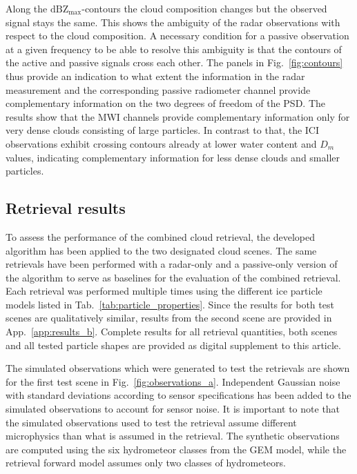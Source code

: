 \documentclass[journal abbreviation, manuscript]{copernicus}
\begin{document}
Along the $\text{dBZ}_\text{max}$-contours the cloud composition changes but the
observed signal stays the same. This shows the ambiguity of the radar
observations with respect to the cloud composition. A necessary condition for a
passive observation at a given frequency to be able to resolve this ambiguity is
that the contours of the active and passive signals cross each other. The panels
in Fig.~\ref{fig:contours} thus provide an indication to what extent the
information in the radar measurement and the corresponding passive radiometer
channel provide complementary information on the two degrees of freedom of the PSD. The
results show that the MWI channels provide complementary information only for
very dense clouds consisting of large particles. In contrast to that, the ICI
observations exhibit crossing contours already at lower water content and $D_m$
values, indicating complementary information for less dense clouds and
smaller particles.

\subsection{Retrieval results}

To assess the performance of the combined cloud retrieval, the developed
algorithm has been applied to the two designated cloud scenes. The same
retrievals have been performed with a radar-only and a passive-only version of
the algorithm to serve as baselines for the evaluation of the combined
retrieval. Each retrieval was performed multiple times using the different ice
particle models listed in Tab.~\ref{tab:particle_properties}. Since the results
for both test scenes are qualitatively similar, results from the second scene
are provided in App.~\ref{app:results_b}. Complete results for all retrieval quantities,
both scenes and all tested particle shapes are provided as digital supplement to
this article.

The simulated observations which were generated to test the retrievals
are shown for the first test scene in Fig.~\ref{fig:observations_a}. Independent
Gaussian noise with standard deviations according to sensor specifications has
been added to the simulated observations to account for sensor noise. It is
important to note that the simulated observations  used to test the
retrieval assume different microphysics than what is assumed in the retrieval.
The synthetic observations are computed using the six hydrometeor classes from
the GEM model, while the retrieval forward model assumes only two classes of
hydrometeors.
\end{document}
